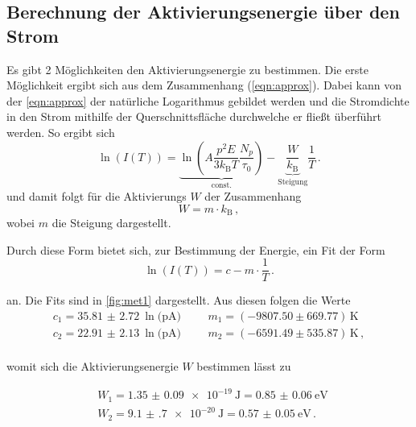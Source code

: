 \subsection{Berechnung der Aktivierungsenergie über den Strom}
Es gibt 2 Möglichkeiten den Aktivierungsenergie zu bestimmen. Die erste Möglichkeit ergibt sich aus dem Zusammenhang (\ref{eqn:approx}). Dabei kann von der \autoref{eqn:approx} der natürliche
Logarithmus gebildet werden und die Stromdichte in den Strom mithilfe der Querschnittsfläche durchwelche er fließt überführt werden. So ergibt sich 
\begin{equation}
    \ln\left(I(T)\right) = \underbrace{\ln\left(A \frac{p^2E}{3 k_\text{B} T} \frac{N_p}{\tau_0}\right)}_{\text{const.}} - \underbrace{\frac{W}{k_\text{B}}}_{\text{Steigung}} \frac{1}{T} \, .
    \label{eqn:geradengleichung}
\end{equation}
und damit folgt für die Aktivierungs $W$ der Zusammenhang
\begin{equation}
    W = m \cdot k_\text{B} \, ,
    \label{eqn:Aktivierungsenergie}
\end{equation}
wobei $m$ die Steigung dargestellt.

\noindent
Durch diese Form bietet sich, zur Bestimmung der Energie, ein Fit der Form 
\begin{equation*}
  \ln{(I(T))} = c - m \cdot \frac{1}{T} \, .
\end{equation*}

\noindent
an. Die Fits sind in \autoref{fig:met1} dargestellt. Aus diesen folgen die Werte
\begin{align*}
  c_1 =  \SI{35.81(272)}{\ln(\pico\ampere)}& && m_1 = (-9807.50\pm 669.77)\,\si{\kelvin} \,  \\
  c_2 =  \SI{22.91(213)}{\ln(\pico\ampere)}& && m_2 = (-6591.49\pm 535.87)\,\si{\kelvin} \, , \\
\end{align*}

\noindent
womit sich die Aktivierungsenergie $W$ bestimmen lässt zu 

\begin{align*}
  & W_{1} = \SI{1.35(9)e-19}{\joule} = \SI{0.85(6)}{\electronvolt} \,  \\
  & W_{2} = \SI{9.1(7)e-20}{\joule} = \SI{0.57(5)}{\electronvolt} \, . \\
\end{align*}


